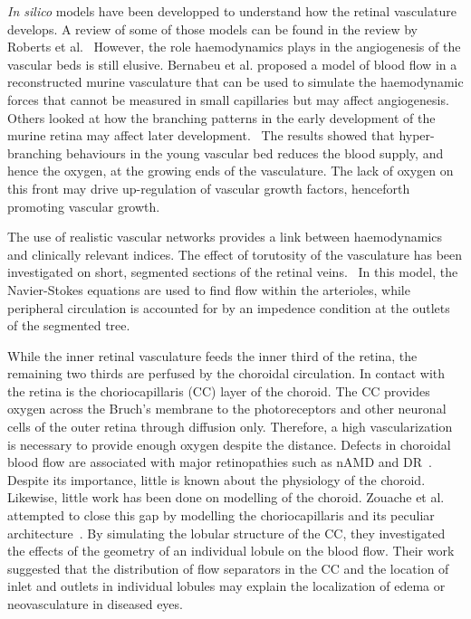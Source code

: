 \documentclass[12pt,a4paper]{journal}
\begin{document}
\textit{In silico} models have been developped to understand how the retinal vasculature develops.
A review of some of those models can be found in the review by Roberts et al.~\cite{Roberts_2016}
However, the role haemodynamics plays in the angiogenesis of the vascular beds is still elusive.
Bernabeu et al. proposed a model of blood flow in a reconstructed murine vasculature that can be used to simulate the haemodynamic forces that cannot be measured in small capillaries but may affect angiogenesis.~\cite{Bernabeu_2014}
Others looked at how the branching patterns in the early development of the murine retina may affect later development.~\cite{Mirzapour_Shafiyi_2021}
The results showed that hyper-branching behaviours in the young vascular bed reduces the blood supply, and hence the oxygen, at the growing ends of the vasculature.
The lack of oxygen on this front may drive up-regulation of vascular growth factors, henceforth promoting vascular growth.


The use of realistic vascular networks provides a link between haemodynamics and clinically relevant indices.
The effect of torutosity of the vasculature has been investigated on short, segmented sections of the retinal veins.~\cite{Malek_2014}
In this model, the Navier-Stokes equations are used to find flow within the arterioles, while peripheral circulation is accounted for by an impedence condition at the outlets of the segmented tree.



While the inner retinal vasculature feeds the inner third of the retina, the remaining two thirds are perfused by the choroidal circulation.
In contact with the retina is the choriocapillaris (CC) layer of the choroid.
The CC provides oxygen across the Bruch's membrane to the photoreceptors and other neuronal cells of the outer retina through diffusion only.
Therefore, a high vascularization is necessary to provide enough oxygen despite the distance.
Defects in choroidal blood flow are associated with major retinopathies such as nAMD and DR~\cite{Pemp_2008}.
Despite its importance, little is known about the physiology of the choroid.
Likewise, little work has been done on modelling of the choroid.
Zouache et al. attempted to close this gap by modelling the choriocapillaris and its peculiar architecture~\cite{Zouache_2015}.
By simulating the lobular structure of the CC, they investigated the effects of the geometry of an individual lobule on the blood flow.
Their work suggested that the distribution of flow separators in the CC and the location of inlet and outlets in individual lobules may explain the localization of edema or neovasculature in diseased eyes.
\end{document}
